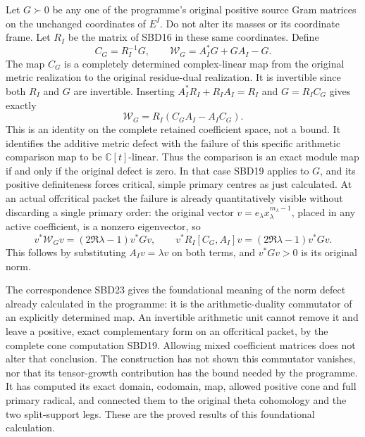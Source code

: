 Let $G\succ0$ be any one of the programme's original positive
source Gram matrices on the unchanged coordinates of $E^I$.
Do not alter its masses or its coordinate frame. Let $R_I$
be the matrix of SBD16 in these same coordinates. Define
\[
 C_G=R_I^{-1}G,\qquad
 \mathcal W_G=A_I^*G+GA_I-G.
 \tag{SBD22}
\]
The map $C_G$ is a completely determined complex-linear
map from the original metric realization to the original
residue-dual realization. It is invertible since both $R_I$
and $G$ are invertible. Inserting
$A_I^*R_I+R_IA_I=R_I$ and $G=R_IC_G$ gives exactly
\[
 \boxed{\quad \mathcal W_G=R_I(C_GA_I-A_IC_G).
       \quad}
 \tag{SBD23}
\]
This is an identity on the complete retained coefficient
space, not a bound. It identifies the additive metric
defect with the failure of this specific arithmetic
comparison map to be $\mathbb C[t]$-linear. Thus the
comparison is an exact module map if and only if the
original defect is zero. In that case SBD19 applies to
$G$, and its positive definiteness forces critical,
simple primary centres as just calculated. At an actual
offcritical packet the failure is already quantitatively
visible without discarding a single primary order: the
original vector $v=e_\lambda x_\lambda^{m_\lambda-1}$,
placed in any active coefficient, is a nonzero eigenvector,
so
\[
 v^*\mathcal W_Gv=(2\Re\lambda-1)v^*Gv,
 \qquad
 v^*R_I[C_G,A_I]v=(2\Re\lambda-1)v^*Gv.
 \tag{SBD24}
\]
This follows by substituting $A_Iv=\lambda v$ on both
terms, and $v^*Gv>0$ is its original norm.

The correspondence SBD23 gives the foundational meaning of
the norm defect already calculated in the programme: it is
the arithmetic-duality commutator of an explicitly determined
map. An invertible arithmetic unit cannot remove it and
leave a positive, exact complementary form on an offcritical
packet, by the complete cone computation SBD19. Allowing
mixed coefficient matrices does not alter that conclusion.
The construction has not shown this commutator vanishes,
nor that its tensor-growth contribution has the bound needed
by the programme. It has computed its exact domain,
codomain, map, allowed positive cone and full primary radical,
and connected them to the original theta cohomology and
the two split-support legs. These are the proved results
of this foundational calculation.
